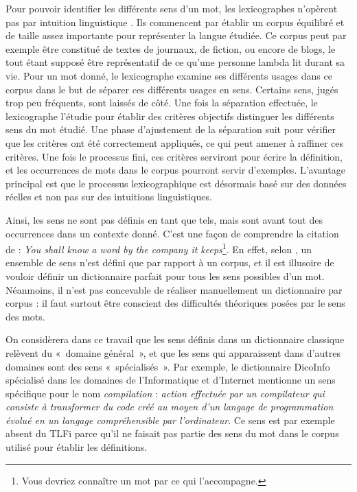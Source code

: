 Pour pouvoir identifier les différents sens d'un mot, les lexicographes
n'opèrent pas par intuition linguistique \citep{kilgarriff1997don}. Ils
commencent par établir un corpus équilibré et de taille assez importante pour
représenter la langue étudiée. Ce corpus peut par exemple être constitué de
textes de journaux, de fiction, ou encore de blogs, le tout étant supposé être
représentatif de ce qu'une personne lambda lit durant sa vie. Pour un mot
donné, le lexicographe examine ses différents usages dans ce corpus dans le but
de séparer ces différents usages en sens. Certains sens, jugés trop peu
fréquents, sont laissés de côté. Une fois la séparation effectuée, le
lexicographe l'étudie pour établir des critères objectifs distinguer les
différents sens du mot étudié. Une phase d'ajustement de la séparation suit
pour vérifier que les critères ont été correctement appliqués, ce qui peut
amener à raffiner ces critères. Une fois le processus fini, ces critères
serviront pour écrire la définition, et les occurrences de mots dans le corpus
pourront servir d'exemples. L'avantage principal est que le processus
lexicographique est désormais basé sur des données réelles et non pas sur des
intuitions linguistiques.


Ainsi, les sens ne sont pas définis en tant que tels, mais sont avant tout des
occurrences dans un contexte donné. C'est une façon de comprendre la citation
de \citep{firth1957synopsys} : \emph{You shall know a word by the company it
keeps}\footnote{Vous devriez connaître un mot par ce qui l'accompagne.}. En
effet, selon \citep{kilgarriff1997don}, un ensemble de sens n'est défini que
par rapport à un corpus, et il est illusoire de vouloir définir un dictionnaire
parfait pour tous les sens possibles d'un mot.  Néanmoins, il n'est pas
concevable de réaliser manuellement un dictionnaire par corpus : il faut
surtout être conscient des difficultés théoriques posées par le sens des mots.

On considèrera dans ce travail que les sens définis dans un dictionnaire
classique relèvent du «~domaine général~», et que les sens qui apparaissent
dans d'autres domaines sont des sens «~spécialisés~». Par exemple, le
dictionnaire DicoInfo \citep{corpusolst} spécialisé dans les domaines de
l'Informatique et d'Internet mentionne un sens spécifique pour le nom
\emph{compilation} : \emph{action effectuée par un compilateur qui consiste à
    transformer du code créé au moyen d'un langage de programmation évolué en
un langage compréhensible par l'ordinateur}. Ce sens est par exemple absent du
TLFi \citep{TLFi} parce qu'il ne faisait pas partie des sens du mot dans le
corpus utilisé pour établir les définitions.

